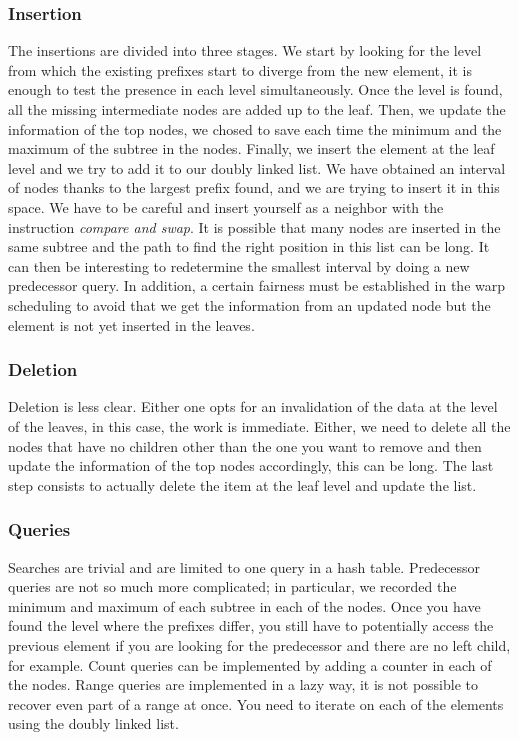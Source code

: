\documentclass[conference]{IEEEtran}
\begin{document}
\subsubsection{Insertion}

The insertions are divided into three stages. We start by looking for the level from which the existing prefixes start to diverge from the new element, it is enough to test the presence in each level simultaneously. Once the level is found, all the missing intermediate nodes are added up to the leaf. Then, we update the information of the top nodes, we chosed to save each time the minimum and the maximum of the subtree in the nodes. Finally, we insert the element at the leaf level and we try to add it to our doubly linked list. We have obtained an interval of nodes thanks to the largest prefix found, and we are trying to insert it in this space. We have to be careful and insert yourself as a neighbor with the instruction \textit{compare and swap}.
It is possible that many nodes are inserted in the same subtree and the path to find the right position in this list can be long. It can then be interesting to redetermine the smallest interval by doing a new predecessor query. In addition, a certain fairness must be established in the warp scheduling to avoid that we get the information from an updated node but the element is not yet inserted in the leaves.

\subsubsection{Deletion}

Deletion is less clear. Either one opts for an invalidation of the data at the level of the leaves, in this case, the work is immediate. Either, we need to delete all the nodes that have no children other than the one you want to remove and then update the information of the top nodes accordingly, this can be long. The last step consists to actually delete the item at the leaf level and update the list.

\subsubsection{Queries}

Searches are trivial and are limited to one query in a hash table. Predecessor queries are not so much more complicated; in particular, we recorded the minimum and maximum of each subtree in each of the nodes. Once you have found the level where the prefixes differ, you still have to potentially access the previous element if you are looking for the predecessor and there are no left child, for example. Count queries can be implemented by adding a counter in each of the nodes. Range queries are implemented in a lazy way, it is not possible to recover even part of a range at once. You need to iterate on each of the elements using the doubly linked list.
\end{document}
